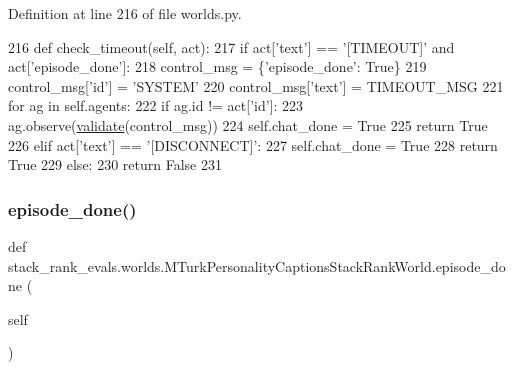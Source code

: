 Definition at line 216 of file worlds.\+py.


\begin{DoxyCode}
216     \textcolor{keyword}{def }check\_timeout(self, act):
217         \textcolor{keywordflow}{if} act[\textcolor{stringliteral}{'text'}] == \textcolor{stringliteral}{'[TIMEOUT]'} \textcolor{keywordflow}{and} act[\textcolor{stringliteral}{'episode\_done'}]:
218             control\_msg = \{\textcolor{stringliteral}{'episode\_done'}: \textcolor{keyword}{True}\}
219             control\_msg[\textcolor{stringliteral}{'id'}] = \textcolor{stringliteral}{'SYSTEM'}
220             control\_msg[\textcolor{stringliteral}{'text'}] = TIMEOUT\_MSG
221             \textcolor{keywordflow}{for} ag \textcolor{keywordflow}{in} self.agents:
222                 \textcolor{keywordflow}{if} ag.id != act[\textcolor{stringliteral}{'id'}]:
223                     ag.observe(\hyperlink{namespaceparlai_1_1core_1_1worlds_afc3fad603b7bce41dbdc9cdc04a9c794}{validate}(control\_msg))
224             self.chat\_done = \textcolor{keyword}{True}
225             \textcolor{keywordflow}{return} \textcolor{keyword}{True}
226         \textcolor{keywordflow}{elif} act[\textcolor{stringliteral}{'text'}] == \textcolor{stringliteral}{'[DISCONNECT]'}:
227             self.chat\_done = \textcolor{keyword}{True}
228             \textcolor{keywordflow}{return} \textcolor{keyword}{True}
229         \textcolor{keywordflow}{else}:
230             \textcolor{keywordflow}{return} \textcolor{keyword}{False}
231 
\end{DoxyCode}
\mbox{\label{classstack__rank__evals_1_1worlds_1_1MTurkPersonalityCaptionsStackRankWorld_ac1e7487bde15df0e0dafd706495a9d10}} 
\subsubsection{\texorpdfstring{episode\+\_\+done()}{episode\_done()}}
{\footnotesize\ttfamily def stack\+\_\+rank\+\_\+evals.\+worlds.\+M\+Turk\+Personality\+Captions\+Stack\+Rank\+World.\+episode\+\_\+done (\begin{DoxyParamCaption}\item[{}]{self }\end{DoxyParamCaption})}



